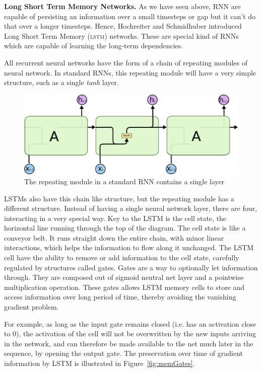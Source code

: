 \noindent\textbf{Long Short Term Memory Networks.} As we have seen above, \textsc{RNN} are capable of persisting an information over a small timesteps or gap but it can't do that over a longer timesteps. Hence, Hochreiter and Schmidhuber introduced Long Short Term Memory (\textsc{lstm}) networks. These are special kind of \textsc{RNN}s which are capable of learning the long-term dependencies.

All recurrent neural networks have the form of a chain of repeating modules of neural network. In standard RNNs, this repeating module will have a very simple structure, such as a single \textit{tanh} layer.

\begin{figure}[h]
\centering
\includegraphics[scale=0.4]{figures/LSTM3-SimpleRNN.png}
\caption{The repeating module in a standard \textsc{RNN} contains a single layer~\cite{colahSite}}
\label{fig:simpleRNN}
\end{figure}

\textsc{LSTM}s also have this chain like structure, but the repeating module has a different structure. Instead of having a single neural network layer, there are four, interacting in a very special way. Key to the \textsc{LSTM} is the cell state, the horizontal line running through  the top of the diagram. The cell state is like a conveyor belt. It runs straight down the entire chain, with minor linear interactions, which helps the information to flow along it unchanged. The \textsc{LSTM} cell have the ability to remove or add information to the cell state, carefully regulated by structures called gates. Gates are a way to optionally let information through. They are composed out of sigmoid neutral net layer and a pointwise multiplication operation. These gates allows \textsc{LSTM} memory cells to store and access information over long period of time, thereby avoiding the vanishing gradient problem. 

For example, as long as the input gate remains closed (i.e. has an activation close to 0), the activation of the cell will not be overwritten by the new inputs arriving in the network, and can therefore be made available to the net much later in the sequence, by opening the output gate.
The preservation over time of gradient information by LSTM is illustrated in Figure~\ref{fig:memGates}.

